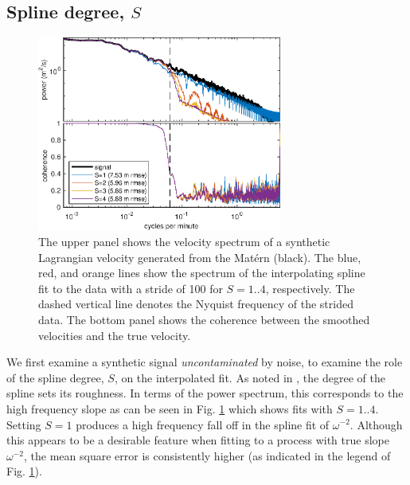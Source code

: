 \documentclass{ametsoc}
\begin{document}
\subsection{Spline degree, $S$} \label{spline_degree}

\begin{figure}
  \centerline{\includegraphics[width=19pc,angle=0]{interpolation_spectrum_slope2degreeVaried.eps}}
  \caption{The upper panel shows the velocity spectrum of a synthetic Lagrangian velocity generated from the Mat\'ern (black). The blue, red, and orange lines show the spectrum of the interpolating spline fit to the data with a stride of 100 for $S=1..4$, respectively. The dashed vertical line denotes the Nyquist frequency of the strided data. The bottom panel shows the coherence between the smoothed velocities and the true velocity.}
  \label{varied_slope}
\end{figure}

We first examine a synthetic signal \emph{uncontaminated} by noise, to examine the role of the spline degree, $S$, on the interpolated fit. As noted in \citet{craven1979-nm}, the degree of the spline sets its roughness. In terms of the power spectrum, this corresponds to the high frequency slope as can be seen in Fig. \ref{varied_slope} which shows fits with $S=1..4$. Setting $S=1$ produces a high frequency fall off in the spline fit of $\omega^{-2}$. Although this appears to be a desirable feature when fitting to a process with true slope $\omega^{-2}$, the mean square error is consistently higher (as indicated in the legend of Fig. \ref{varied_slope}).
\end{document}
